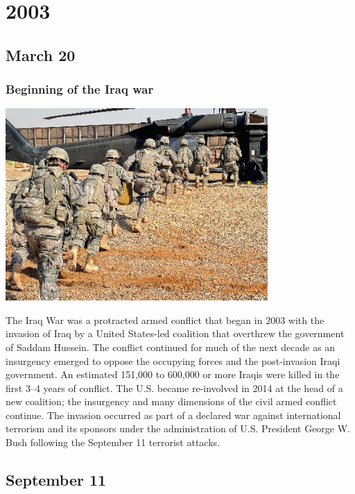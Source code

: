 \documentclass[11pt]{report}
\begin{document}
\chapter{2003}
\section{March 20}
\subsection{Beginning of the Iraq war}
\vspace{2mm}\begin{center}\includegraphics[width=10cm]{./img/iraqWar.jpg}\end{center}
The Iraq War was a protracted armed conflict that began in 2003 with the invasion of Iraq by a United States-led coalition that overthrew the government of Saddam Hussein. The conflict continued for much of the next decade as an insurgency emerged to oppose the occupying forces and the post-invasion Iraqi government. An estimated 151,000 to 600,000 or more Iraqis were killed in the first 3–4 years of conflict. The U.S. became re-involved in 2014 at the head of a new coalition; the insurgency and many dimensions of the civil armed conflict continue. The invasion occurred as part of a declared war against international terrorism and its sponsors under the administration of U.S. President George W. Bush following the September 11 terrorist attacks.

\section{September 11}
\end{document}
